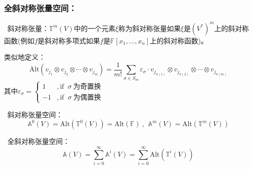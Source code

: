 \documentclass[zihao=5,UTF8]{report}
\def\F{\mathbb{F}}
\def\T{\mathbb{T}}
\theoremstyle{mystyle} %
\begin{document}
\subsubsection{全斜对称张量空间：}
\par{}\ 斜对称张量：$\T^m(V)$中的一个元素$\xi$称为斜对称张量如果$\xi$是$(V^*)^m$上的斜对称函数(例如$f$是斜对称多项式如果$f$是$\F[x_1,...,x_n]$上的斜对称函数)。
{\par\color{gray}\small
类似地定义：
\begin{equation*}
    \text{Alt}(v_{j_1} \otimes v_{j_2} \otimes\cdots \otimes v_{j_m}) =  \frac{1}{m!}\sum_{\sigma\in S_m}\varepsilon_{\sigma}\cdot v_{j_{\sigma(1)}} \otimes v_{j_{\sigma(2)}} \otimes\cdots \otimes v_{j_{\sigma(m)}}
\end{equation*}   
其中$\varepsilon_{\sigma}=\begin{cases}
    1 &, \text{if }\  \sigma\ \text{为奇置换}\\
    -1 &, \text{if }\  \sigma\ \text{为偶置换}
\end{cases}$
\par}

\par
{}\  斜对称张量空间：
\begin{equation*}
    \mathbb{A}^0(V) = \text{Alt}(\T^0(V)) = \text{Alt}(\F) \ ,\ \ \mathbb{A}^m(V) = \text{Alt}(\T^m(V))
\end{equation*}

\par
{}\  全斜对称张量空间：
\begin{equation*}
    \mathbb{A}(V) = \sum_{i=0}^{\infty} \mathbb{A}^i(V) = \sum_{i=0}^{\infty}\text{Alt}(\T^i(V))
\end{equation*}   \par



\nocite{*}

\thispagestyle{fancy} 
\end{document}
